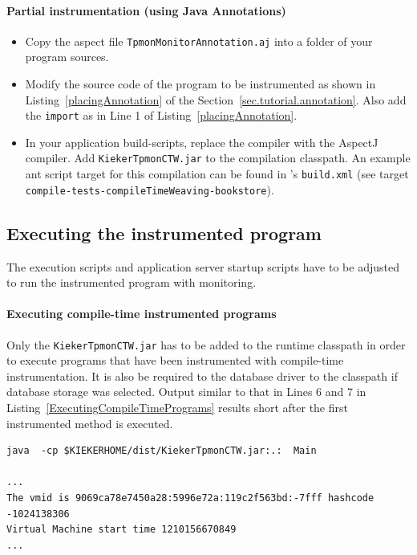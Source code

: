 \documentclass[a4paper,12pt]{scrartcl}
\begin{document}
\paragraph{Partial instrumentation (using Java Annotations)}
\begin{itemize}
\item  Copy the aspect file \texttt{\small TpmonMonitorAnnotation.aj} into a folder of your program sources.
\item Modify the source code of the program to be instrumented as shown in Listing~\ref{placingAnnotation} of the Section~\ref{sec.tutorial.annotation}. Also add the \texttt{import} as in Line 1 of Listing~\ref{placingAnnotation}.
\item In your application build-scripts, replace the compiler with the AspectJ compiler. Add \texttt{KiekerTpmonCTW.jar} to the compilation classpath. An example ant script target for this compilation can be found in \tpmon{}'s \texttt{build.xml} (see target \\ \texttt{compile-tests-compileTimeWeaving-bookstore}).
\end{itemize}

\subsection{Executing the instrumented program}
The execution scripts and application server startup scripts have to be adjusted to run the instrumented program with monitoring.

\paragraph{Executing compile-time instrumented programs}
Only the \texttt{KiekerTpmonCTW.jar} has to be added to the runtime classpath in order to execute programs that have been instrumented with compile-time instrumentation. It is also be required to the database driver to the classpath if database storage was selected. Output similar to that in Lines 6 and 7 in Listing~\ref{ExecutingCompileTimePrograms} results short after the first instrumented method is executed.

\begin{lstlisting}[caption={Execution of a compile-time instrumented program},label={ExecutingCompileTimePrograms}]
java  -cp $KIEKERHOME/dist/KiekerTpmonCTW.jar:.:  Main

...
The vmid is 9069ca78e7450a28:5996e72a:119c2f563bd:-7fff hashcode -1024138306
Virtual Machine start time 1210156670849
...
\end{lstlisting}
\end{document}
